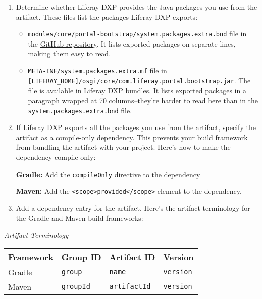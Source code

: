 \begin{enumerate}
\def\labelenumi{\arabic{enumi}.}
\item
  Determine whether Liferay DXP provides the Java packages you use from
  the artifact. These files list the packages Liferay DXP exports:

  \begin{itemize}
  \item
    \texttt{modules/core/portal-bootstrap/system.packages.extra.bnd}
    file in the
    \href{https://github.com/liferay/liferay-portal/blob/7.2.x/modules/core/portal-bootstrap/system.packages.extra.bnd}{GitHub
    repository}. It lists exported packages on separate lines, making
    them easy to read.
  \item
    \texttt{META-INF/system.packages.extra.mf} file in
    \texttt{{[}LIFERAY\_HOME{]}/osgi/core/com.liferay.portal.bootstrap.jar}.
    The file is available in Liferay DXP bundles. It lists exported
    packages in a paragraph wrapped at 70 columns--they're harder to
    read here than in the \texttt{system.packages.extra.bnd} file.
  \end{itemize}
\item
  If Liferay DXP exports all the packages you use from the artifact,
  specify the artifact as a compile-only dependency. This prevents your
  build framework from bundling the artifact with your project. Here's
  how to make the dependency compile-only:

  \textbf{Gradle:} Add the \texttt{compileOnly} directive to the
  dependency

  \textbf{Maven:} Add the
  \texttt{\textless{}scope\textgreater{}provided\textless{}/scope\textgreater{}}
  element to the dependency.
\item
  Add a dependency entry for the artifact. Here's the artifact
  terminology for the Gradle and Maven build frameworks:
\end{enumerate}

\emph{Artifact Terminology}

\noindent\hrulefill

\begin{longtable}[]{@{}llll@{}}
\toprule\noalign{}
Framework & Group ID & Artifact ID & Version \\
\midrule\noalign{}
\endhead
\bottomrule\noalign{}
\endlastfoot
Gradle & \texttt{group} & \texttt{name} & \texttt{version} \\
Maven & \texttt{groupId} & \texttt{artifactId} & \texttt{version} \\
\end{longtable}

